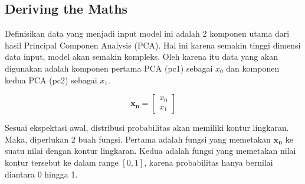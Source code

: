 \subsection{Deriving the Maths}

Definisikan data yang menjadi input model ini adalah 2 komponen utama dari hasil Principal Componen Analysis (PCA). Hal ini karena semakin tinggi dimensi data input, model akan semakin kompleks. Oleh karena itu data yang akan digunakan adalah komponen pertama PCA (pc1) sebagai $x_0$ dan komponen kedua PCA (pc2) sebagai $x_1$.

\begin{equation}
    \mathbf{x_n}=\begin{bmatrix} x_0 \\ x_1 \end{bmatrix}
\end{equation}

Sesuai ekspektasi awal, distribusi probabilitas akan memiliki kontur lingkaran. Maka, diperlukan 2 buah fungsi. Pertama adalah fungsi yang memetakan $\mathbf{x_n}$ ke suatu nilai dengan kontur lingkaran. Kedua adalah fungsi yang memetakan nilai kontur tersebut ke dalam range $[0,1]$, karena probabilitas hanya bernilai diantara 0 hingga 1.

